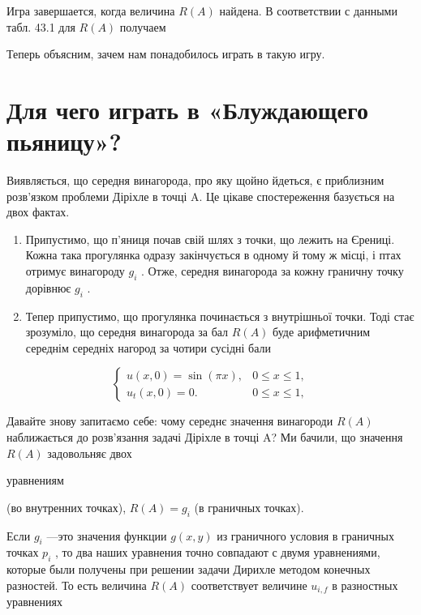 \documentclass[
  ukrainian,
]{article}
\begin{document}
Игра завершается, когда величина \(R\left(A\right)\) найдена. В
соответствии с данными табл. 43.1 для \(R\left(A\right)\) получаем

Теперь объясним, зачем нам понадобилось играть в такую игру.

\section{Для чего играть в «Блуждающего
пьяницу»?}\label{ux434ux43bux44f-ux447ux435ux433ux43e-ux438ux433ux440ux430ux442ux44c-ux432-ux431ux43bux443ux436ux434ux430ux44eux449ux435ux433ux43e-ux43fux44cux44fux43dux438ux446ux443}

Виявляється, що середня винагорода, про яку щойно йдеться, є приблизним
розв'язком проблеми Діріхле в точці A. Це цікаве спостереження базується
на двох фактах.

\begin{enumerate}
\def\labelenumi{\arabic{enumi}.}
\item
  Припустимо, що п'яниця почав свій шлях з точки, що лежить на Єрениці.
  Кожна така прогулянка одразу закінчується в одному й тому ж місці, і
  птах отримує винагороду \(g_i\) . Отже, середня винагорода за кожну
  граничну точку дорівнює \(g_i\) .
\item
  Тепер припустимо, що прогулянка починається з внутрішньої точки. Тоді
  стає зрозуміло, що середня винагорода за бал \(R(A)\) буде
  арифметичним середнім середніх нагород за чотири сусідні бали
\end{enumerate}

\[
\begin{cases} u(x, 0) = \sin(\pi x), & 0 \le x \le 1, \\ u_t(x, 0) = 0. & 0 \le x \le 1, \end{cases}
\]

Давайте знову запитаємо себе: чому середнє значення винагороди \(R(A)\)
наближається до розв'язання задачі Діріхле в точці A? Ми бачили, що
значення \(R(A)\) задовольняє двох

уравнениям

(во внутренних точках), \(R(A) = g_i\) (в граничных точках).

Если \(g_i\) ---это значения функции \(g(x, y)\) из граничного условия в
граничных точках \(p_i\) , то два наших уравнения точно совпадают с
двумя уравнениями, которые были получены при решении задачи Дирихле
методом конечных разностей. То есть величина \(R(A)\) соответствует
величине \(u_{i,f}\) в разностных уравнениях
\end{document}
